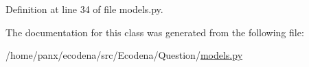 Definition at line 34 of file models.py.



The documentation for this class was generated from the following file:\begin{DoxyCompactItemize}
\item 
/home/panx/ecodena/src/Ecodena/Question/\hyperlink{_question_2models_8py}{models.py}\end{DoxyCompactItemize}
